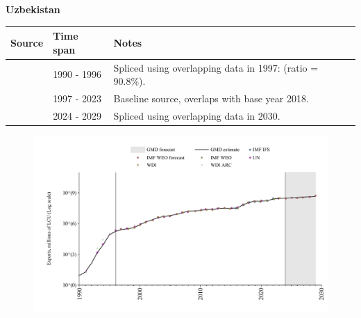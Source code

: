 \documentclass[12pt,a4paper,landscape]{article}
\begin{document}
\begin{adjustbox}{max totalsize={\paperwidth}{\paperheight},center}
\begin{minipage}[t][\textheight][t]{\textwidth}
\vspace*{0.5cm}
{}
\begin{center}
{\Large\bfseries Uzbekistan}
\end{center}
\vspace{0.5cm}
\begin{table}[H]
\centering
\small
\begin{tabular}{|l|l|l|}
\hline
\textbf{Source} & \textbf{Time span} & \textbf{Notes} \\
\hline
\rowcolor{white}\cite{UN}& 1990 - 1996 &Spliced using overlapping data in 1997: (ratio = 90.8\%).\\
\rowcolor{lightgray}\cite{WDI}& 1997 - 2023 &Baseline source, overlaps with base year 2018.\\
\rowcolor{white}\cite{IMF_WEO_forecast}& 2024 - 2029 &Spliced using overlapping data in 2030.\\
\hline
\end{tabular}
\end{table}
\begin{figure}[H]
\centering
\includegraphics[width=\textwidth,height=0.6\textheight,keepaspectratio]{graphs/UZB_exports.pdf}
\end{figure}
\end{minipage}
\end{adjustbox}
\end{document}
